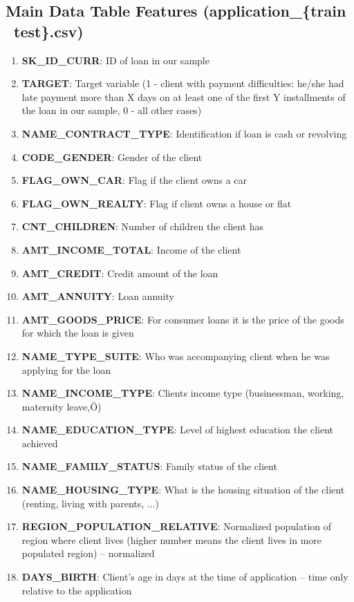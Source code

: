 \documentclass[12pt, letterpaper]{article}
\begin{document}
\begin{appendices}
\subsection{Main Data Table Features (application_\{train \textbar~test\}.csv)}
\begin{enumerate}
  \item \textbf{SK_ID_CURR}: ID of loan in our sample
  \item \textbf{TARGET}: Target variable (1 - client with payment difficulties: he/she had late payment more than X days on at least one of the first Y installments of the loan in our sample, 0 - all other cases)
  \item \textbf{NAME_CONTRACT_TYPE}: Identification if loan is cash or revolving
  \item \textbf{CODE_GENDER}: Gender of the client
  \item \textbf{FLAG_OWN_CAR}: Flag if the client owns a car
  \item \textbf{FLAG_OWN_REALTY}: Flag if client owns a house or flat
  \item \textbf{CNT_CHILDREN}: Number of children the client has
  \item \textbf{AMT_INCOME_TOTAL}: Income of the client
  \item \textbf{AMT_CREDIT}: Credit amount of the loan
  \item \textbf{AMT_ANNUITY}: Loan annuity
  \item \textbf{AMT_GOODS_PRICE}: For consumer loans it is the price of the goods for which the loan is given
  \item \textbf{NAME_TYPE_SUITE}: Who was accompanying client when he was applying for the loan
  \item \textbf{NAME_INCOME_TYPE}: Clients income type (businessman, working, maternity leave,Ö)
  \item \textbf{NAME_EDUCATION_TYPE}: Level of highest education the client achieved
  \item \textbf{NAME_FAMILY_STATUS}: Family status of the client
  \item \textbf{NAME_HOUSING_TYPE}: What is the housing situation of the client (renting, living with parents, ...)
  \item \textbf{REGION_POPULATION_RELATIVE}: Normalized population of region where client lives (higher number means the client lives in more populated region) -- normalized
  \item \textbf{DAYS_BIRTH}: Client's age in days at the time of application -- time only relative to the application

\end{enumerate}
\end{appendices}
\end{document}
